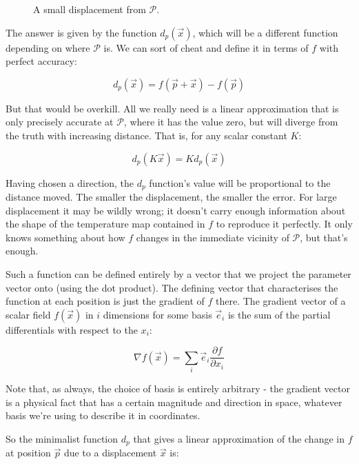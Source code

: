 \begin{figure}[h]
    \centering
    \caption{A small displacement from $\mathcal{P}$.} \label{fig:vector-displacement}
\end{figure}

The answer is given by the function $d_p(\vec{x})$, which will be a different function depending on where $\mathcal{P}$ is. We can sort of cheat and define it in terms of $f$ with perfect accuracy:

$$
d_p(\vec{x}) = f(\vec{p} + \vec{x}) - f(\vec{p})
$$

But that would be overkill. All we really need is a linear approximation that is only precisely accurate at $\mathcal{P}$, where it has the value zero, but will diverge from the truth with increasing distance. That is, for any scalar constant $K$:

$$
d_p(K \vec{x}) = K d_p(\vec{x})
$$

Having chosen a direction, the $d_p$ function's value will be proportional to the distance moved. The smaller the displacement, the smaller the error. For large displacement it may be wildly wrong; it doesn't carry enough information about the shape of the temperature map contained in $f$ to reproduce it perfectly. It only knows something about how $f$ changes in the immediate vicinity of $\mathcal{P}$, but that's enough.

Such a function can be defined entirely by a vector that we project the parameter vector onto (using the dot product). The defining vector that characterises the function at each position is just the gradient of $f$ there. The gradient vector of a scalar field $f(\vec{x})$ in $i$ dimensions for some basis $\vec{e}_i$ is the sum of the partial differentials with respect to the $x_i$:

$$
\nabla f(\vec{x}) = \sum_i \vec{e}_i \frac{\partial f}{\partial x_i}
$$

Note that, as always, the choice of basis is entirely arbitrary - the gradient vector is a physical fact that has a certain magnitude and direction in space, whatever basis we're using to describe it in coordinates.

So the minimalist function $d_p$ that gives a linear approximation of the change in $f$ at position $\vec{p}$ due to a displacement $\vec{x}$ is:

